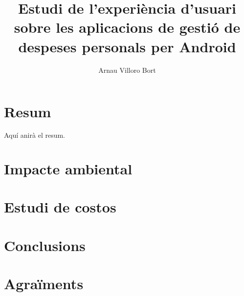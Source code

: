 \documentclass{book}
\title{Estudi de l'experiència d'usuari sobre les aplicacions de gestió de despeses personals per Android}
\author{Arnau Villoro Bort}
\begin{document}
\newcommand{\blueA}{\cellcolor{blue_table_1}}
\newcommand{\blueB}{\cellcolor{blue_table_2}}
\newcommand{\blueC}{\cellcolor{blue_table_3}}
\newcommand{\headA}[1]{\multicolumn{1}{|c|}{\blueA \textbf{#1}}}
\newcommand{\headB}[1]{\multicolumn{1}{|c|}{\blueB \textbf{#1}}}
\newcommand{\headC}[1]{\multicolumn{1}{|c|}{\blueC \textbf{#1}}}
\newcommand{\noBorde}[1]{\multicolumn{1}{#1}{}}


\frontmatter




\chapter*{Resum} \label{sec:Resum}
Aquí anirà el resum.

\tableofcontents





\mainmatter








\chapter{Impacte ambiental}
\chapter{Estudi de costos}

\chapter{Conclusions}
\chapter{Agraïments}


\end{document}
